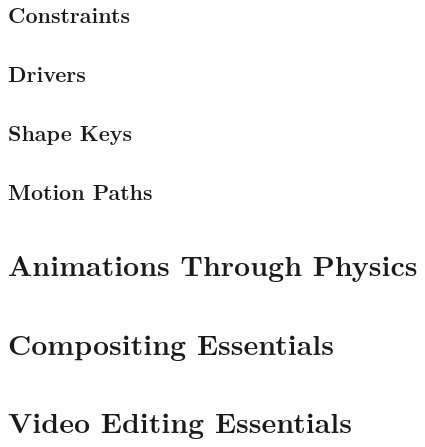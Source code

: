 \documentclass{article}
\begin{document}
\subsection{Constraints}
\subsection{Drivers}
\subsection{Shape Keys}
\subsection{Motion Paths}

\section{Animations Through Physics}

\section{Compositing Essentials}

\section{Video Editing Essentials}
\end{document}
